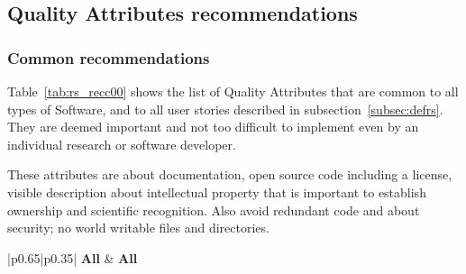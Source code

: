 \subsection{Quality Attributes recommendations}


\subsubsection{Common recommendations}

Table~\ref{tab:rs_recc00} shows the list of Quality Attributes that are common to all types of Software, and to all user stories described in subsection~\ref{subsec:defrs}. They are deemed important and not too difficult to implement even by an individual research or software developer.

These attributes are about documentation, open source code including a license, visible description about intellectual property that is important to establish ownership and scientific recognition. Also avoid redundant code and about security; no world writable files and directories.

\begin{center}
    \tabletail{\hline}
    \label{tab:rs_recc00}
    \small
    \begin{supertabular}{|p{0.65\linewidth}|p{0.35\linewidth}|} \hline
    \textbf{All} &
    \textbf{All} \\ \hline \hline

     \\ \hline
     \\ \hline
     \\ \hline
     \\ \hline
     \\ \hline
     \\ \hline
     \\ \hline
     \\ \hline
     \\ \hline
     \\ \hline

\end{supertabular}
\end{center}

